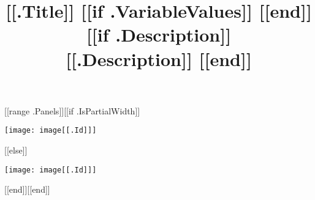 \documentclass[titlepage]{article}
\begin{document}
\title{[[.Title]] [[if .VariableValues]] [[end]] [[if .Description]] \\ \small [[.Description]] [[end]]}
\date{}
\maketitle
\begin{center}
[[range .Panels]][[if .IsPartialWidth]]\begin{minipage}{[[.Width]]\textwidth}
\texttt{[image: image[[.Id]]]}
\end{minipage}
[[else]]\par
\vspace{0.5cm}
\texttt{[image: image[[.Id]]]}
\par
\vspace{0.5cm}
[[end]][[end]]
\end{center}
\end{document}
